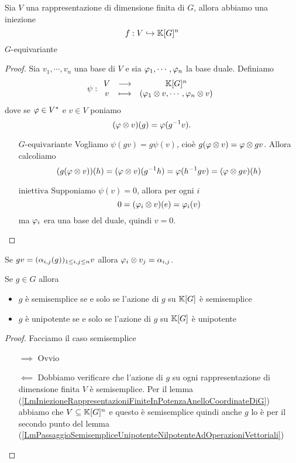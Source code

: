 \begin{lemma}\label{LmIniezioneRappresentazioniFiniteInPotenzaAnelloCoordinateDiG}
Sia $V$ una rappresentazione di dimensione finita di $G$, allora abbiamo una iniezione
\[f:V\hookrightarrow \mathbb{K}[G]^n\]
$G$-equivariante
\end{lemma}
\begin{proof}
Sia $v_1,\cdots, v_n$ una base di $V$ e sia $\varphi_1,\cdots, \varphi_n$ la base duale. Definiamo
\[\psi:\begin{array}{ccc} {V} & \longrightarrow & {\mathbb{K}[G]^n}\\ {v} & \longmapsto & {(\varphi_1\otimes v,\cdots, \varphi_n\otimes v)} \end{array}\]
dove se $\varphi\in V^\ast$ e $v\in V$ poniamo
\[(\varphi\otimes v)(g)=\varphi(g^{-1} v).\]
\setlength{\leftmargini}{0cm}
\begin{itemize}
\item[$\boxed{G\text{-equivariante}}$] Vogliamo $\psi(gv)=g\psi(v)$, cio\`e $g(\varphi\otimes v)=\varphi\otimes gv$. Allora calcoliamo
\[(g(\varphi\otimes v))(h)=(\varphi\otimes v)(g^{-1} h)=\varphi(h^{-1} g v)=(\varphi\otimes gv)(h)\]
\item[$\boxed{\text{iniettiva}}$] Supponiamo $\psi(v)=0$, allora per ogni $i$
\[0=(\varphi_i\otimes v)(e)=\varphi_i(v)\]
ma $\varphi_i$ era una base del duale, quindi $v=0$.
\end{itemize}
\setlength{\leftmargini}{0.5cm}
\end{proof}

\begin{remark}
Se $gv=(\alpha_{i,j}(g))_{1\leq i,j\leq n} v$ allora $\varphi_i\otimes v_j=\alpha_{i,j}$.
\end{remark}

\begin{corollary}\label{CorControlloSemisempliceSuAnelloCoordinate}
Se $g\in G$ allora
\begin{itemize}
    \item $g$ \`e semisemplice se e solo se l'azione di $g$ su $\mathbb{K}[G]$ \`e semisemplice
    \item $g$ \`e unipotente se e solo se l'azione di $g$ su $\mathbb{K}[G]$ \`e unipotente
\end{itemize}
\end{corollary}
\begin{proof}
Facciamo il caso semisemplice
\setlength{\leftmargini}{0cm}
\begin{itemize}
\item[$\boxed{\implies}$] Ovvio
\item[$\boxed{\impliedby}$] Dobbiamo verificare che l'azione di $g$ su ogni rappresentazione di dimensione finita $V$ \`e semisemplice. Per il lemma (\ref{LmIniezioneRappresentazioniFiniteInPotenzaAnelloCoordinateDiG}) abbiamo che $V\subseteq \mathbb{K}[G]^n$ e questo \`e semisemplice quindi anche $g$ lo \`e per il secondo punto del lemma (\ref{LmPassaggioSemisempliceUnipotenteNilpotenteAdOperazioniVettoriali}) 
\end{itemize}
\setlength{\leftmargini}{0.5cm}
\end{proof}



